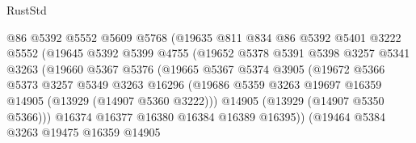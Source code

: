 \begin{lexlean}{RustStd}
\begin{coremodule}
                              @86
                              @5392
                              @5552
                              @5609
                              @5768
                              (@19635
                                @811
                                @834
                                @86
                                @5392
                                @5401
                                @3222
                                @5552
                                (@19645
                                  @5392
                                  @5399
                                  @4755
                                  (@19652
                                    @5378
                                    @5391
                                    @5398
                                    @3257
                                    @5341
                                    @3263
                                    (@19660
                                      @5367
                                      @5376
                                      (@19665
                                        @5367
                                        @5374
                                        @3905
                                        (@19672
                                          @5366
                                          @5373
                                          @3257
                                          @5349
                                          @3263
                                          @16296
                                          (@19686
                                            @5359
                                            @3263
                                            @19697
                                            @16359
                                            @14905
                                            (@13929 (@14907 @5360 @3222)))
                                          @14905
                                          (@13929 (@14907 @5350 @5366)))
                                        @16374
                                        @16377
                                        @16380
                                        @16384
                                        @16389
                                        @16395))
                                    (@19464
                                      @5384
                                      @3263
                                      @19475
                                      @16359
                                      @14905

\end{coremodule}
\end{lexlean}
